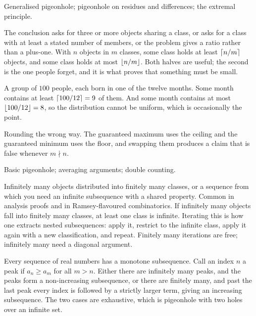 \begin{seealsob}Generalised pigeonhole; pigeonhole on residues and differences; the extremal principle.\end{seealsob}

\cue The conclusion asks for three or more objects sharing a class, or asks for a class with at least a stated number of members, or the problem gives a ratio rather than a plus-one.
\method With $n$ objects in $m$ classes, some class holds at least $\left\lceil n/m\right\rceil$ objects, and some class holds at most $\left\lfloor n/m\right\rfloor$. Both halves are useful; the second is the one people forget, and it is what proves that something must be small.

\begin{worked}
A group of $100$ people, each born in one of the twelve months. Some month contains at least $\left\lceil 100/12\right\rceil=9$ of them. And some month contains at most $\left\lfloor 100/12\right\rfloor=8$, so the distribution cannot be uniform, which is occasionally the point.
\end{worked}

\begin{trap}
Rounding the wrong way. The guaranteed maximum uses the ceiling and the guaranteed minimum uses the floor, and swapping them produces a claim that is false whenever $m\nmid n$.
\end{trap}

\begin{seealsob}Basic pigeonhole; averaging arguments; double counting.\end{seealsob}

\cue Infinitely many objects distributed into finitely many classes, or a sequence from which you need an infinite subsequence with a shared property. Common in analysis proofs and in Ramsey-flavoured combinatorics.
\method If infinitely many objects fall into finitely many classes, at least one class is infinite. Iterating this is how one extracts nested subsequences: apply it, restrict to the infinite class, apply it again with a new classification, and repeat. Finitely many iterations are free; infinitely many need a diagonal argument.

\begin{worked}
Every sequence of real numbers has a monotone subsequence. Call an index $n$ a peak if $a_{n}\geq a_{m}$ for all $m>n$. Either there are infinitely many peaks, and the peaks form a non-increasing subsequence, or there are finitely many, and past the last peak every index is followed by a strictly larger term, giving an increasing subsequence. The two cases are exhaustive, which is pigeonhole with two holes over an infinite set.
\end{worked}

